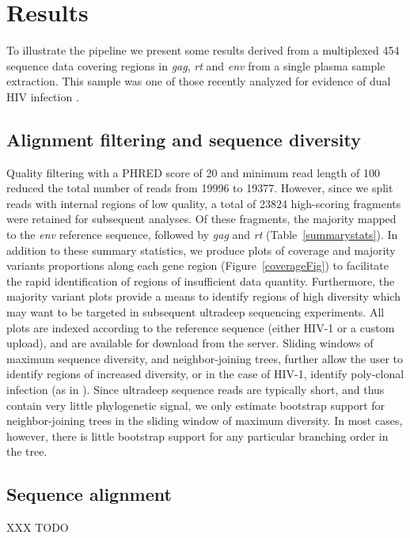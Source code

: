 \documentclass[10pt]{article}
\begin{document}
\section*{Results}

To illustrate the pipeline we present some results derived
from a multiplexed 454 sequence data covering regions in \textit{gag}, \textit{rt} and \textit{env}
from a single plasma sample extraction.
This sample was one of those recently analyzed for evidence of dual HIV infection \cite{Pacold2010}.

\subsection*{Alignment filtering and sequence diversity}
Quality filtering with a PHRED score of 20 and minimum read length of 100 reduced the total number of reads from 19996 to 19377.
However, since we split reads with internal regions of low quality,
a total of 23824 high-scoring fragments were retained for subsequent analyses.
Of these fragments, the majority mapped to the \textit{env} reference sequence,
followed by \textit{gag} and \textit{rt} (Table~\ref{summarystats}).
In addition to these summary statistics,
we produce plots of coverage and majority variants proportions along each gene region (Figure~\ref{coverageFig})
to facilitate the rapid identification of regions of insufficient data quantity.
Furthermore, the majority variant plots provide a means to identify regions of high diversity
which may want to be targeted in subsequent ultradeep sequencing experiments.
All plots are indexed according to the reference sequence (either HIV-1 or a custom upload),
and are available for download from the server.
Sliding windows of maximum sequence diversity, and neighbor-joining trees,
further allow the user to identify regions of increased diversity,
or in the case of HIV-1, identify poly-clonal infection (as in \cite{Pacold2010}).
Since ultradeep sequence reads are typically short,
and thus contain very little phylogenetic signal,
we only estimate bootstrap support for neighbor-joining trees in the sliding window of maximum diversity.
In most cases, however, there is little bootstrap support for any particular branching order in the tree.

\subsection*{Sequence alignment}
XXX TODO
\end{document}
